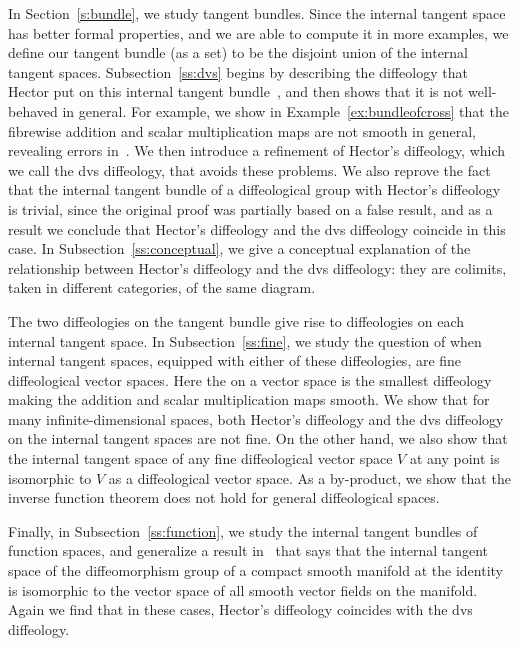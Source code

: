 \documentclass[12pt]{amsart}
\newcommand{\dfn}[1]{\textbf{\boldmath{#1}}}
\theoremstyle{remark}
\begin{document}
In Section~\ref{s:bundle}, we study tangent bundles.
Since the internal tangent space has better formal properties, and
we are able to compute it in more examples,
we define our tangent bundle (as a set) to be the disjoint union
of the internal tangent spaces.
Subsection~\ref{ss:dvs} begins by describing the diffeology that Hector
put on this internal tangent bundle~\cite{He},
and then shows that it is not well-behaved in general.
For example, we show in Example~\ref{ex:bundleofcross} that the fibrewise addition and scalar
multiplication maps are not smooth in general, revealing errors in~\cite{He,HM,La}.
We then introduce a refinement of Hector's diffeology, which we call the dvs diffeology,
that avoids these problems.
%
We also reprove the fact that the internal tangent bundle of a diffeological group
with Hector's diffeology is trivial, since the original proof was partially based on a
false result, and as a result we conclude that Hector's diffeology and the dvs diffeology coincide
in this case.
In Subsection~\ref{ss:conceptual}, we give a conceptual explanation of the
relationship between Hector's diffeology and the dvs diffeology:  they are
colimits, taken in different categories, of the same diagram.

The two diffeologies on the tangent bundle give rise to
diffeologies on each internal tangent space.
In Subsection~\ref{ss:fine}, we study the question of when internal tangent spaces,
equipped with either of these diffeologies,
are fine diffeological vector spaces.  Here the \dfn{fine diffeology} on a vector
space is the smallest diffeology making the addition and scalar multiplication maps smooth.
We show that for many infinite-dimensional spaces,
both Hector's diffeology and the dvs diffeology on the internal tangent spaces are not fine.
On the other hand, we also show that the internal tangent space of any
fine diffeological vector space $V$ at any point
is isomorphic to $V$ as a diffeological vector space.
As a by-product, we show that the inverse function theorem does not hold for general diffeological spaces.

Finally, in Subsection~\ref{ss:function}, we study the internal tangent bundles of function spaces,
and generalize a result in~\cite{He,HM} that says that the internal tangent space of
the diffeomorphism group of a compact smooth manifold at the identity is isomorphic
to the vector space of all smooth vector fields on the manifold.
Again we find that in these cases, Hector's diffeology coincides with the dvs diffeology.
\end{document}

